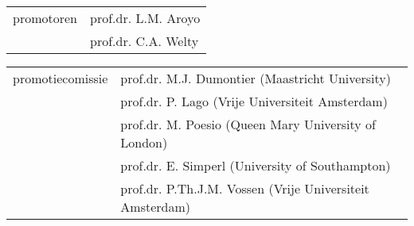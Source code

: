 \thispagestyle{empty}

\begin{addmargin}[-3cm]{1cm}

\begin{flushleft}
\begin{tabular}{l l}
promotoren & prof.dr. L.M. Aroyo\\
& prof.dr. C.A. Welty\\
\end{tabular}
\end{flushleft}

\end{addmargin}

\newpage


\begin{flushleft}
\begin{tabular}{l l}
promotiecomissie & prof.dr. M.J. Dumontier (Maastricht University) \\
& prof.dr. P. Lago (Vrije Universiteit Amsterdam) \\
& prof.dr. M. Poesio (Queen Mary University of London) \\
& prof.dr. E. Simperl (University of Southampton) \\
& prof.dr. P.Th.J.M. Vossen (Vrije Universiteit Amsterdam) \\
\end{tabular}
\end{flushleft}







